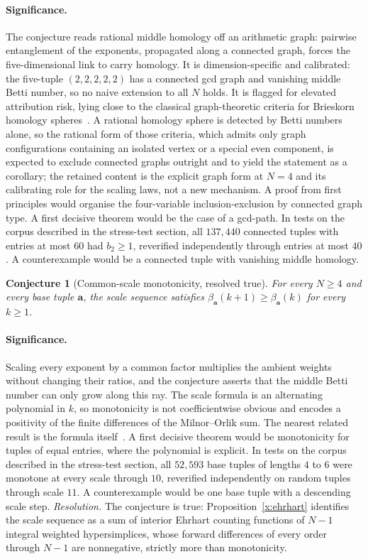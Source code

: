 \documentclass[11pt]{article}
\newtheorem{conjecture}{Conjecture}
\theoremstyle{definition}
\begin{document}
\paragraph{Significance.}
The conjecture reads rational middle homology off an arithmetic graph: pairwise entanglement of the exponents, propagated along a connected graph, forces the five-dimensional link to carry homology.  It is dimension-specific and calibrated: the five-tuple $(2,2,2,2,2)$ has a connected gcd graph and vanishing middle Betti number, so no naive extension to all $N$ holds.  It is flagged for elevated attribution risk, lying close to the classical graph-theoretic criteria for Brieskorn homology spheres~\cite{MO70,BG08}.  A rational homology sphere is detected by Betti numbers alone, so the rational form of those criteria, which admits only graph configurations containing an isolated vertex or a special even component, is expected to exclude connected graphs outright and to yield the statement as a corollary; the retained content is the explicit graph form at $N=4$ and its calibrating role for the scaling laws, not a new mechanism.  A proof from first principles would organise the four-variable inclusion-exclusion by connected graph type.  A first decisive theorem would be the case of a gcd-path.  In tests on the corpus described in the stress-test section, all $137{,}440$ connected tuples with entries at most $60$ had $b_2\ge1$, reverified independently through entries at most $40$.  A counterexample would be a connected tuple with vanishing middle homology.

\begin{conjecture}[Common-scale monotonicity, resolved true]\label{x9}
For every $N\ge4$ and every base tuple $\mathbf a$, the scale sequence satisfies $\beta_{\mathbf a}(k+1)\ge\beta_{\mathbf a}(k)$ for every $k\ge1$.
\end{conjecture}

\paragraph{Significance.}
Scaling every exponent by a common factor multiplies the ambient weights without changing their ratios, and the conjecture asserts that the middle Betti number can only grow along this ray.  The scale formula is an alternating polynomial in $k$, so monotonicity is not coefficientwise obvious and encodes a positivity of the finite differences of the Milnor--Orlik sum.  The nearest related result is the formula itself~\cite{MO70}.  A first decisive theorem would be monotonicity for tuples of equal entries, where the polynomial is explicit.  In tests on the corpus described in the stress-test section, all $52{,}593$ base tuples of lengths $4$ to $6$ were monotone at every scale through $10$, reverified independently on random tuples through scale $11$.  A counterexample would be one base tuple with a descending scale step.  \emph{Resolution.} The conjecture is true: Proposition~\ref{x:ehrhart} identifies the scale sequence as a sum of interior Ehrhart counting functions of $N-1$ integral weighted hypersimplices, whose forward differences of every order through $N-1$ are nonnegative, strictly more than monotonicity.
\end{document}
